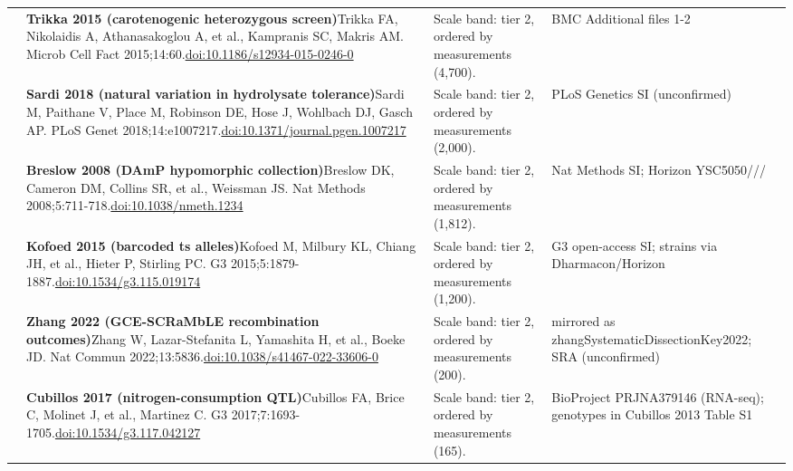 \begin{landscape}
\begin{longtable}{@{}r@{\hspace{4pt}} L{86mm} L{92mm} L{62mm}@{}}
 & \textbf{Trikka 2015 (carotenogenic heterozygous screen)}\newline Trikka FA, Nikolaidis A, Athanasakoglou A, et al., Kampranis SC, Makris AM. Microb Cell Fact 2015;14:60.\newline \href{https://doi.org/10.1186/s12934-015-0246-0}{doi:10.1186/\allowbreak s12934-015-0246-0} & Scale band: tier 2, ordered by measurements (4,700). & BMC Additional files 1-2 \\
 & \textbf{Sardi 2018 (natural variation in hydrolysate tolerance)}\newline Sardi M, Paithane V, Place M, Robinson DE, Hose J, Wohlbach DJ, Gasch AP. PLoS Genet 2018;14:e1007217.\newline \href{https://doi.org/10.1371/journal.pgen.1007217}{doi:10.1371/\allowbreak journal.pgen.1007217} & Scale band: tier 2, ordered by measurements (2,000). & PLoS Genetics SI (unconfirmed) \\
 & \textbf{Breslow 2008 (DAmP hypomorphic collection)}\newline Breslow DK, Cameron DM, Collins SR, et al., Weissman JS. Nat Methods 2008;5:711-718.\newline \href{https://doi.org/10.1038/nmeth.1234}{doi:10.1038/\allowbreak nmeth.1234} & Scale band: tier 2, ordered by measurements (1,812). & Nat Methods SI; Horizon YSC5050/// \\
 & \textbf{Kofoed 2015 (barcoded ts alleles)}\newline Kofoed M, Milbury KL, Chiang JH, et al., Hieter P, Stirling PC. G3 2015;5:1879-1887.\newline \href{https://doi.org/10.1534/g3.115.019174}{doi:10.1534/\allowbreak g3.115.019174} & Scale band: tier 2, ordered by measurements (1,200). & G3 open-access SI; strains via Dharmacon/\allowbreak Horizon \\
 & \textbf{Zhang 2022 (GCE-SCRaMbLE recombination outcomes)}\newline Zhang W, Lazar-Stefanita L, Yamashita H, et al., Boeke JD. Nat Commun 2022;13:5836.\newline \href{https://doi.org/10.1038/s41467-022-33606-0}{doi:10.1038/\allowbreak s41467-022-33606-0} & Scale band: tier 2, ordered by measurements (200). & mirrored as zhangSystematicDissectionKey2022; SRA (unconfirmed) \\
 & \textbf{Cubillos 2017 (nitrogen-consumption QTL)}\newline Cubillos FA, Brice C, Molinet J, et al., Martinez C. G3 2017;7:1693-1705.\newline \href{https://doi.org/10.1534/g3.117.042127}{doi:10.1534/\allowbreak g3.117.042127} & Scale band: tier 2, ordered by measurements (165). & BioProject PRJNA379146 (RNA-seq); genotypes in Cubillos 2013 Table S1 \\

\end{longtable}
\end{landscape}
